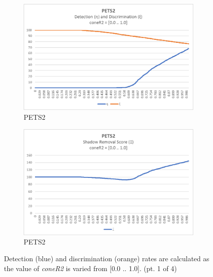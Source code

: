 \begin{appendices}
\begin{figure}
\hfill
\begin{subfigure}{.45\linewidth}
  \includegraphics[width=1\linewidth]{figures/appendix/pets2_coneR2_response.jpg}
  \caption{PETS2}
\end{subfigure}
\hfill
\begin{subfigure}{.45\linewidth}
  \includegraphics[width=1\linewidth]{figures/appendix/pets2_coneR2_score.jpg}
  \caption{PETS2}
\end{subfigure}
\caption{Detection (blue) and discrimination (orange) rates are calculated as the value of \textit{coneR2} is varied from [0.0 .. 1.0]. (pt. 1 of 4)}

\end{figure}

\begin{figure}


\end{figure}
\end{appendices}
